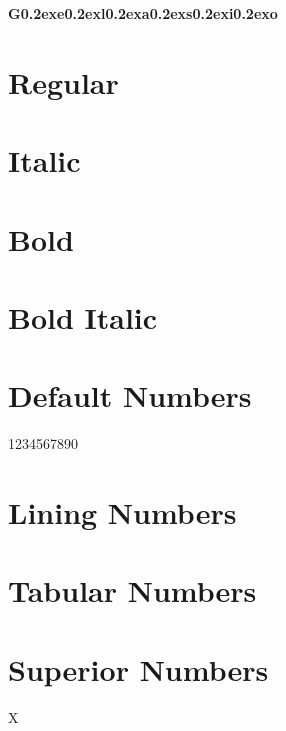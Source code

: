 \documentclass{article}
\newcommand{\Section}[1]{\section*{\textbf{#1}}}
\renewcommand{\,}{\kern0.2ex}
\begin{document}
\begin{center}\huge
\textbf{G\,e\,l\,a\,s\,i\,o}\\[0.5ex]
\end{center}


\Section{Regular}
\lipsum[1]

\Section{Italic}
\textit{\lipsum[2]}

\Section{Bold}
\textbf{\lipsum[3]}

\Section{Bold Italic}
\textbf{\emph{\lipsum[4]}}


\Section{Default Numbers}

1234567890

\Section{Lining Numbers}


\Section{Tabular Numbers}


\Section{Superior Numbers}

X
\end{document}
